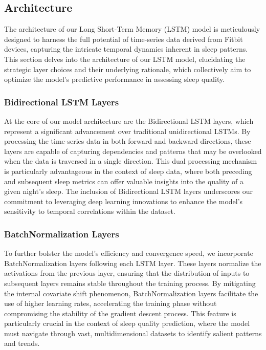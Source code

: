 \documentclass[10pt]{extarticle}
\begin{document}
\subsection{Architecture}

The architecture of our Long Short-Term Memory (LSTM) model is meticulously designed to harness the full potential of time-series data derived from Fitbit devices, capturing the intricate temporal dynamics inherent in sleep patterns. This section delves into the architecture of our LSTM model, elucidating the strategic layer choices and their underlying rationale, which collectively aim to optimize the model's predictive performance in assessing sleep quality.

\subsubsection{Bidirectional LSTM Layers}

At the core of our model architecture are the Bidirectional LSTM layers, which represent a significant advancement over traditional unidirectional LSTMs. By processing the time-series data in both forward and backward directions, these layers are capable of capturing dependencies and patterns that may be overlooked when the data is traversed in a single direction. This dual processing mechanism is particularly advantageous in the context of sleep data, where both preceding and subsequent sleep metrics can offer valuable insights into the quality of a given night's sleep. The inclusion of Bidirectional LSTM layers underscores our commitment to leveraging deep learning innovations to enhance the model's sensitivity to temporal correlations within the dataset.

\subsubsection{BatchNormalization Layers}

To further bolster the model's efficiency and convergence speed, we incorporate BatchNormalization layers following each LSTM layer. These layers normalize the activations from the previous layer, ensuring that the distribution of inputs to subsequent layers remains stable throughout the training process. By mitigating the internal covariate shift phenomenon, BatchNormalization layers facilitate the use of higher learning rates, accelerating the training phase without compromising the stability of the gradient descent process. This feature is particularly crucial in the context of sleep quality prediction, where the model must navigate through vast, multidimensional datasets to identify salient patterns and trends.
\end{document}
